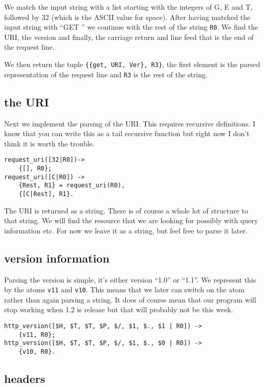 \documentclass[a4paper,11pt]{article}
\begin{document}
We match the input string with a list starting with the integers of G, E and T,
followed by 32 (which is the ASCII value for space). After having
matched the input string with ``GET '' we continue with the rest of
the string {\tt R0}. We find the URI, the version and finally, the
carriage return and line feed that is the end of the request line. 

We then return the tuple {\tt \{\{get, URI, Ver\}, R3\}}, the first
element is the parsed representation of the request line and {\tt R3}
is the rest of the string.


\subsection{the URI}

Next we implement the parsing of the URI. This requires recursive
definitions. I know that you can write this as a tail recursive
function but right now I don't think it is worth the trouble.

\begin{verbatim}
request_uri([32|R0])->
    {[], R0};
request_uri([C|R0]) ->
    {Rest, R1} = request_uri(R0),
    {[C|Rest], R1}.
\end{verbatim}

The URI is returned as a string. There is of course a whole lot of
structure to that string. We will find the resource that we are
looking for possibly with query information etc. For now we leave it
as a string, but feel free to parse it later.

\subsection{version information}

Parsing the version is simple, it's either version ``1.0'' or
``1.1''. We represent this by the atoms {\tt v11} and {\tt v10}. This
means that we later can switch on the atom rather than again parsing a
string. It does of course mean that our program will stop working when
1.2 is release but that will probably not be this week.

\begin{verbatim}
http_version([$H, $T, $T, $P, $/, $1, $., $1 | R0]) ->
    {v11, R0};
http_version([$H, $T, $T, $P, $/, $1, $., $0 | R0]) ->
    {v10, R0}.
\end{verbatim}

\subsection{headers}
\end{document}
